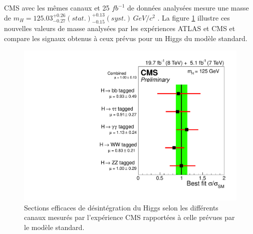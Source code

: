 \begin{figure}[!htb]
\begin{center}
    \end{center}
    \caption{}
    \label{fig:CMS_ATLAS}
  \end{figure}
 
  CMS avec les m\^emes canaux et 25 $fb^{-1}$ de donn\'ees analys\'ees mesure une masse de $m_H = 125.03^{+0.26}_{-0.27} (stat.) ^{+0.13}_{-0.15} (syst.) \, GeV/c^2$ \cite{CMS-PAS-HIG-14-009}. La figure \ref{fig:CMS_ATLAS} illustre ces nouvelles valeurs de masse analys\'ees par les exp\'eriences ATLAS et CMS et compare les signaux obtenus \`a ceux pr\'evus pour un Higgs du mod\`ele standard.
  

  \begin{figure}[!htb]
    \begin{center} 
      \includegraphics[scale=0.45]{./figures/Higgs_decay_CMS.pdf}
      \caption{Sections efficaces de d\'esint\'egration du Higgs selon les diff\'erents canaux mesur\'es par l'exp\'erience CMS rapport\'ees \`a celle pr\'evues par le mod\`ele standard. \cite{CMS-PAS-HIG-14-009}}
     \label{fig:CMS_decay_Higgs}
     \end{center}
  \end{figure}

